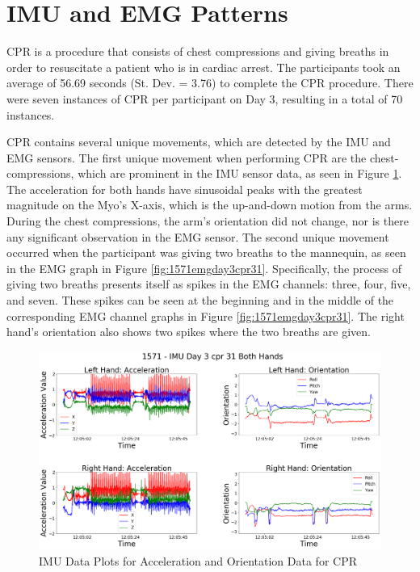 \section{IMU and EMG Patterns}
\label{sec:Results:Patterns}
CPR is a procedure that consists of chest compressions and giving breaths in order to resuscitate a patient who is in cardiac arrest. The participants took an average of 56.69 seconds (St. Dev. = 3.76) to complete the CPR procedure. There were seven instances of CPR per participant on Day 3, resulting in a total of 70 instances.
\par CPR contains several unique movements, which are detected by the IMU and EMG sensors. The first unique movement when performing CPR are the chest-compressions, which are prominent in the IMU sensor data, as seen in Figure \ref{fig:1571imuday3cpr31}. The acceleration for both hands have sinusoidal peaks with the greatest magnitude on the Myo's X-axis, which is the up-and-down motion from the arms. During the chest compressions, the arm's orientation did not change, nor is there any significant observation in the EMG sensor. The second unique movement occurred when the participant was giving two breaths to the mannequin, as seen in the EMG graph in Figure \ref{fig:1571emgday3cpr31}. Specifically, the process of giving two breaths presents itself as spikes in the EMG channels: three, four, five, and seven. These spikes can be seen at the beginning and in the middle of the corresponding EMG channel graphs in Figure \ref{fig:1571emgday3cpr31}. The right hand's orientation also shows two spikes where the two breaths are given.
\begin{figure}[!h]
	\centering
	\includegraphics[width=\linewidth]{pictures/1571_IMU_Day3_cpr_31}
	\caption{IMU Data Plots for Acceleration and Orientation Data for CPR}
	\label{fig:1571imuday3cpr31}
\end{figure}

